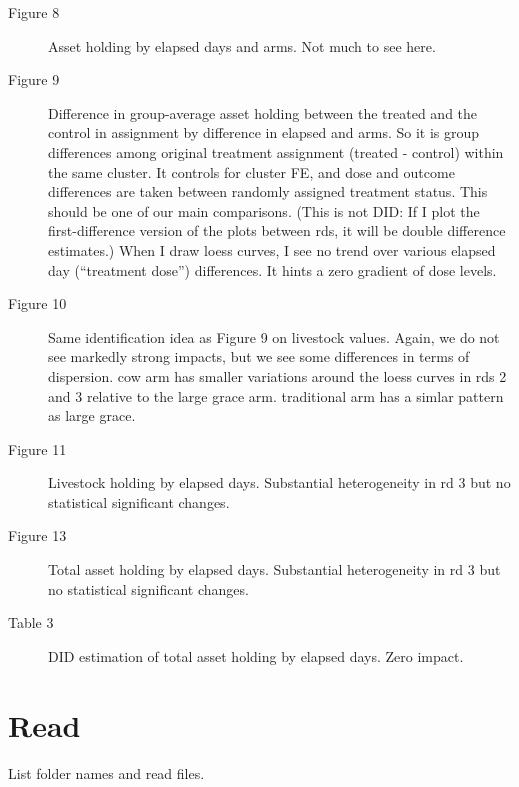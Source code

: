 \begin{description}
\item[Figure 8]	Asset holding by \textsf{elapsed} days and \textsf{arms}. Not much to see here.
\item[Figure 9]	Difference in group-average asset holding between the treated and the control in \textsf{assignment} by difference in \textsf{elapsed} and \textsf{arms}. So it is group differences among original treatment assignment (treated - control) within the same cluster. It controls for cluster FE, and dose and outcome differences are taken between randomly assigned treatment status. This should be one of our main comparisons. (This is not DID: If I plot the first-difference version of the plots between rds, it will be double difference estimates.) When I draw loess curves, I see no trend over various elapsed day (``treatment dose'') differences. It hints a zero gradient of dose levels.
\item[Figure 10]	Same identification idea as Figure 9 on livestock values. Again, we do not see markedly strong impacts, but we see some differences in terms of dispersion. \textsf{cow} arm has smaller variations around the loess curves in rds 2 and 3 relative to the \textsf{large grace} arm. \textsf{traditional} arm has a simlar pattern as \textsf{large grace}.
\item[Figure 11]	Livestock holding by \textsf{elapsed} days. Substantial heterogeneity in rd 3 but no statistical significant changes.
\item[Figure 13]	Total asset holding by \textsf{elapsed} days. Substantial heterogeneity in rd 3 but no statistical significant changes.
\item[Table 3]	DID estimation of total asset holding by \textsf{elapsed} days. Zero impact.
\end{description}


\section{Read}

List folder names and read files.
\begin{Schunk}
\end{Schunk}

